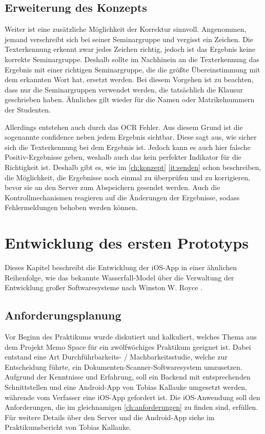 \documentclass[notables, nomenclature, oneside, 150]{HSMW-Thesis}
\begin{document}
	\section{Erweiterung des Konzepts}\label{sc:erweiterungkonzept}
		Weiter ist eine zusätzliche Möglichkeit der Korrektur sinnvoll. Angenommen, jemand verschreibt sich bei seiner Seminargruppe und vergisst ein Zeichen. Die Texterkennung erkennt zwar jedes Zeichen richtig, jedoch ist das Ergebnis keine korrekte Seminargruppe. Deshalb sollte im Nachhinein an die Texterkennung das Ergebnis mit einer richtigen Seminargruppe, die die größte Übereinstimmung mit dem erkannten Wort hat, ersetzt werden. Bei diesem Vorgehen ist zu beachten, dass nur die Seminargruppen verwendet werden, die tatsächlich die Klausur geschrieben haben. Ähnliches gilt wieder für die Namen oder Matrikelnummern der Studenten.
		
		Allerdings entstehen auch durch das OCR Fehler. Aus diesem Grund ist die sogenannte confidence neben jedem Ergebnis sichtbar. Diese sagt aus, wie sicher sich die Texterkennung bei dem Ergebnis ist. Jedoch kann es auch hier falsche Positiv-Ergebnisse geben, weshalb auch das kein perfekter Indikator für die Richtigkeit ist. Deshalb gibt es, wie im \autoref{ch:konzept} \autoref{it:senden} schon beschreiben, die Möglichkeit, die Ergebnisse noch einmal zu überprüfen und zu korrigieren, bevor sie an den Server zum Abspeichern gesendet werden. Auch die Kontrollmechanismen reagieren auf die Änderungen der Ergebnisse, sodass Fehlermeldungen behoben werden können. 


\chapter{Entwicklung des ersten Prototyps}\label{ch:prototyp}
	Dieses Kapitel beschreibt die Entwicklung der iOS-App in einer ähnlichen Reihenfolge, wie das bekannte Wasserfall-Model über die Verwaltung der Entwicklung großer Softwaresysteme nach Winston W. Royce \cite{royce_managing_1970}.
	
	\section{Anforderungsplanung}\label{sc:anforderungsplanung}
	Vor Beginn des Praktikums wurde diskutiert und kalkuliert, welches Thema aus dem Projekt Memo Space für ein zwölfwöchiges Praktikum geeignet ist. Dabei entstand eine Art Durchführbarkeits- / Machbarkeitsstudie, welche zur Entscheidung führte, ein Dokumenten-Scanner-Softwaresystem umzusetzen. Aufgrund der Kenntnisse und Erfahrung, soll ein Backend mit entsprechenden Schnittstellen und eine Android-App von Tobias Kallauke umgesetzt werden, währende vom Verfasser eine iOS-App gefordert ist. Die iOS-Anwendung soll den Anforderungen, die im gleichnamigen \autoref{ch:anforderungen} zu finden sind, erfüllen. Für weitere Details über den Server und die Android-App siehe im Praktikumsbericht von Tobias Kallauke.
\end{document}
